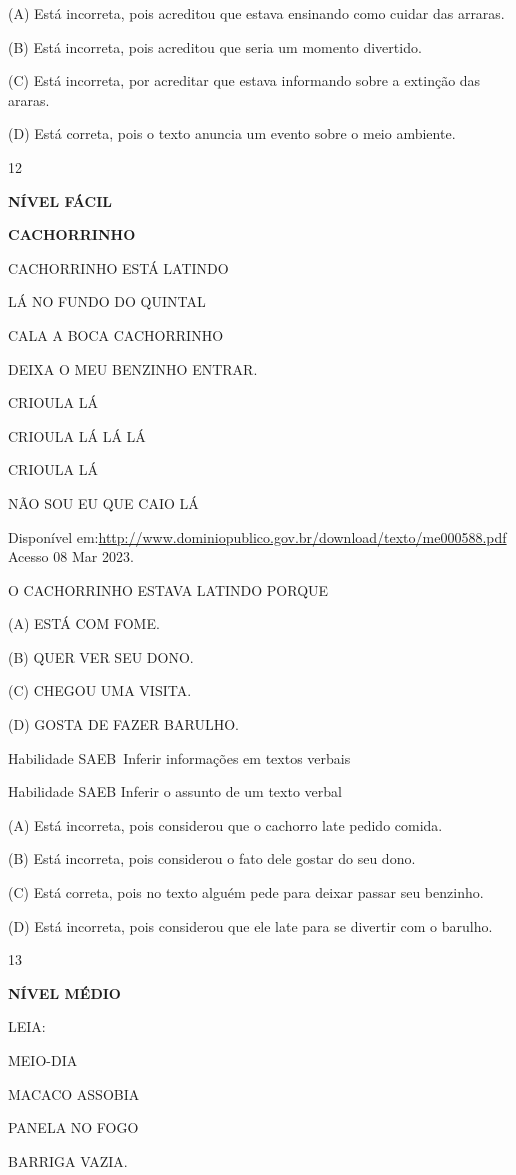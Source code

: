 {{(A) Está incorreta, pois acreditou que estava ensinando como cuidar das
arraras.

(B) Está incorreta, pois acreditou que seria um momento divertido.

(C) Está incorreta, por acreditar que estava informando sobre a extinção
das araras.

(D) Está correta, pois o texto anuncia um evento sobre o meio ambiente.

\num{12}

\textbf{NÍVEL FÁCIL}

\textbf{CACHORRINHO}

CACHORRINHO ESTÁ LATINDO

LÁ NO FUNDO DO QUINTAL

CALA A BOCA CACHORRINHO

DEIXA O MEU BENZINHO ENTRAR.

CRIOULA LÁ

CRIOULA LÁ LÁ LÁ

CRIOULA LÁ

NÃO SOU EU QUE CAIO LÁ

Disponível
em:\url{http://www.dominiopublico.gov.br/download/texto/me000588.pdf}
Acesso 08 Mar 2023.

O CACHORRINHO ESTAVA LATINDO PORQUE

(A) ESTÁ COM FOME.

(B) QUER VER SEU DONO.

(C) CHEGOU UMA VISITA.

(D) GOSTA DE FAZER BARULHO.

Habilidade SAEB~Inferir informações em textos verbais

Habilidade SAEB Inferir o assunto de um texto verbal

(A) Está incorreta, pois considerou que o cachorro late pedido comida.

(B) Está incorreta, pois considerou o fato dele gostar do seu dono.

(C) Está correta, pois no texto alguém pede para deixar passar seu
benzinho.

(D) Está incorreta, pois considerou que ele late para se divertir com o
barulho.

\num{13}

\textbf{NÍVEL MÉDIO}

LEIA:

MEIO-DIA

MACACO ASSOBIA

PANELA NO FOGO

BARRIGA VAZIA.

}}
